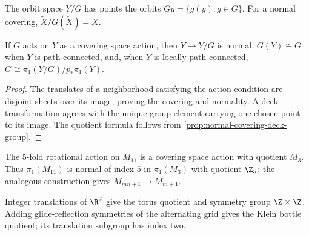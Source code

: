 \begin{definition}
\label{def:orbit-space}
\leanok
{}
The orbit space $Y/G$ has points the orbits $Gy=\{g(y):g\in G\}$. For a
normal covering, $\widetilde X/G(\widetilde X)=X$.
\end{definition}

\begin{proposition}
\label{prop:covering-space-action-quotient}
\leanok
{}
If $G$ acts on $Y$ as a covering space action, then $Y\to Y/G$ is normal,
$G(Y)\cong G$ when $Y$ is path-connected, and, when $Y$ is locally
path-connected, $G\cong\pi_1(Y/G)/p_*\pi_1(Y)$.
\end{proposition}

\begin{proof}
\leanok
\sketch The translates of a neighborhood satisfying the action condition are
disjoint sheets over its image, proving the covering and normality. A deck
transformation agrees with the unique group element carrying one chosen point
to its image. The quotient formula follows from
\cref{prop:normal-covering-deck-group}.
\end{proof}

\begin{example}
\label{ex:genus-11-torus-covering}
The 5-fold rotational action on $M_{11}$ is a covering space action with
quotient $M_3$. Thus $\pi_1(M_{11})$ is normal of index $5$ in $\pi_1(M_3)$
with quotient $\Z_5$; the analogous construction gives $M_{mn+1}\to M_{m+1}$.
\end{example}

\begin{example}
\label{ex:grid-symmetries-torus-klein-bottle}
Integer translations of $\R^2$ give the torus quotient and symmetry group
$\Z\times\Z$. Adding glide-reflection symmetries of the alternating grid gives
the Klein bottle quotient; its translation subgroup has index two.
\end{example}


